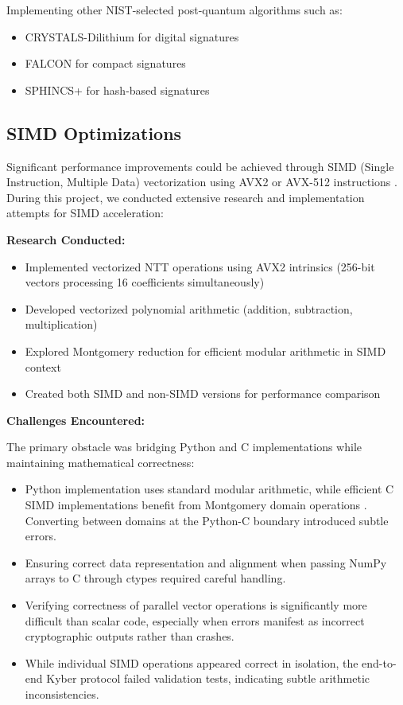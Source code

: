 Implementing other NIST-selected post-quantum algorithms such as:
\begin{itemize}
\item CRYSTALS-Dilithium for digital signatures \cite{NIST-Selection}
\item FALCON for compact signatures \cite{NIST-Selection}
\item SPHINCS+ for hash-based signatures \cite{NIST-Selection}
\end{itemize}

\subsection{SIMD Optimizations}

Significant performance improvements could be achieved through SIMD (Single Instruction, Multiple Data) vectorization using AVX2 or AVX-512 instructions \cite{intel_sdm}. During this project, we conducted extensive research and implementation attempts for SIMD acceleration:

\textbf{Research Conducted:}
\begin{itemize}
\item Implemented vectorized NTT operations using AVX2 intrinsics (256-bit vectors processing 16 coefficients simultaneously)
\item Developed vectorized polynomial arithmetic (addition, subtraction, multiplication)
\item Explored Montgomery reduction for efficient modular arithmetic in SIMD context \cite{Montgomery1985}
\item Created both SIMD and non-SIMD versions for performance comparison
\end{itemize}

\textbf{Challenges Encountered:}

The primary obstacle was bridging Python and C implementations while maintaining mathematical correctness:
\begin{itemize}
\item Python implementation uses standard modular arithmetic, while efficient C SIMD implementations benefit from Montgomery domain operations \cite{Montgomery1985}. Converting between domains at the Python-C boundary introduced subtle errors.
\item Ensuring correct data representation and alignment when passing NumPy arrays to C through ctypes required careful handling.
\item Verifying correctness of parallel vector operations is significantly more difficult than scalar code, especially when errors manifest as incorrect cryptographic outputs rather than crashes.
\item While individual SIMD operations appeared correct in isolation, the end-to-end Kyber protocol failed validation tests, indicating subtle arithmetic inconsistencies.
\end{itemize}

